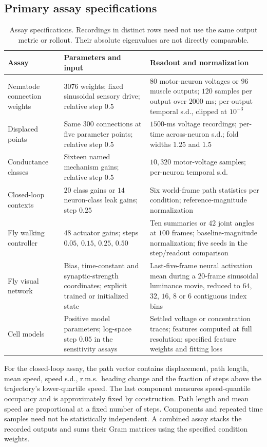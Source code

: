 \documentclass[11pt,letterpaper]{article}
\begin{document}
\subsection{Primary assay specifications}
{\small
\begin{longtable}{p{}p{}p{}}
\caption{Assay specifications. Recordings in distinct rows need not use the same output metric or rollout. Their absolute eigenvalues are not directly comparable.}\label{tab:assays}\\
\toprule Assay & Parameters and input & Readout and normalization \\\midrule\endhead
Nematode connection weights & $3076$ weights; fixed sinusoidal sensory drive; relative step $0.5$ & $80$ motor-neuron voltages or $96$ muscle outputs; $120$ samples per output over $2000$ ms; per-output temporal s.d., clipped at $10^{-3}$ \\
Displaced points & Same $300$ connections at five parameter points; relative step $0.5$ & $1500$-ms voltage recordings; per-time across-neuron s.d.; fold widths $1.25$ and $1.5$ \\
Conductance classes & Sixteen named mechanism gains; relative step $0.5$ & $10{,}320$ motor-voltage samples; per-neuron temporal s.d. \\
Closed-loop contexts & $20$ class gains or $14$ neuron-class leak gains; step $0.25$ & Six world-frame path statistics per condition; reference-magnitude normalization \\
Fly walking controller & $48$ actuator gains; steps $0.05$, $0.15$, $0.25$, $0.50$ & Ten summaries or $42$ joint angles at $100$ frames; baseline-magnitude normalization; five seeds in the step/readout comparison \\
Fly visual network & Bias, time-constant and synaptic-strength coordinates; explicit trained or initialized state & Last-five-frame neural activation mean during a $20$-frame sinusoidal luminance movie, reduced to $64$, $32$, $16$, $8$ or $6$ contiguous index bins \\
Cell models & Positive model parameters; log-space step $0.05$ in the sensitivity assays & Settled voltage or concentration traces; features computed at full resolution; specified feature weights and fitting loss \\
\bottomrule
\end{longtable}
}

For the closed-loop assay, the path vector contains displacement, path length, mean speed, speed s.d., r.m.s.\ heading change and the fraction of steps above the trajectory's lower-quartile speed. The last component measures speed-quantile occupancy and is approximately fixed by construction. Path length and mean speed are proportional at a fixed number of steps. Components and repeated time samples need not be statistically independent. A combined assay stacks the recorded outputs and sums their Gram matrices using the specified condition weights.
\end{document}
